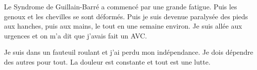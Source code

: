 Le Syndrome de Guillain-Barré a commencé par une grande fatigue. Puis les genoux
et les chevilles se sont déformés. Puis je suis devenue paralysée des pieds aux
hanches, puis aux mains, le tout en une semaine environ. Je suis allée aux
urgences et on m'a dit que j'avais fait un AVC.

Je suis dans un fauteuil roulant et j'ai perdu mon indépendance. Je dois
dépendre des autres pour tout. La douleur est constante et tout est une lutte.
